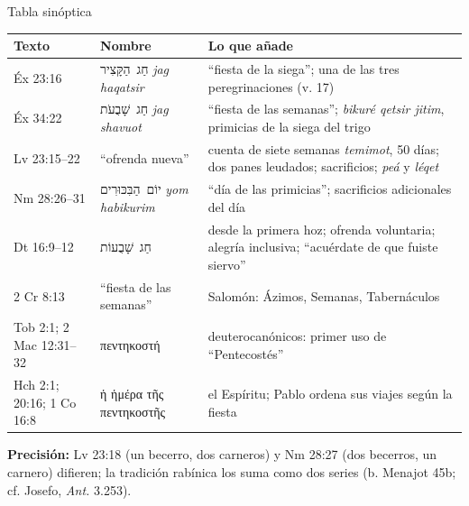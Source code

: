 \documentclass[hyperref={bookmarks=false},aspectratio=169]{beamer}
\newcommand{\heb}[1]{\mbox{\foreignlanguage{hebrew}{#1}}}
\newcommand{\grc}[1]{\foreignlanguage{ancientgreek}{#1}}
\newcommand{\precision}[1]{{\footnotesize\color{sepia}\textbf{Precisión:} #1}}
\begin{document}
\begin{frame}{Tabla sinóptica}
\scriptsize\renewcommand{\arraystretch}{1.12}
\begin{tabular}{@{}L{1.9cm}L{3.0cm}L{6.9cm}@{}}
\toprule
\textbf{Texto} & \textbf{Nombre} & \textbf{Lo que añade} \\ \midrule
Éx 23:16 & \heb{חַג הַקָּצִיר} \emph{jag haqatsir} & ``fiesta de la siega''; una de las tres peregrinaciones (v. 17) \\
Éx 34:22 & \heb{חַג שָׁבֻעֹת} \emph{jag shavuot} & ``fiesta de las semanas''; \emph{bikuré qetsir jitim}, primicias de la siega del trigo \\
Lv 23:15--22 & ``ofrenda nueva'' & cuenta de siete semanas \emph{temimot}, 50 días; dos panes leudados; sacrificios; \emph{peá} y \emph{léqet} \\
Nm 28:26--31 & \heb{יוֹם הַבִּכּוּרִים} \emph{yom habikurim} & ``día de las primicias''; sacrificios adicionales del día \\
Dt 16:9--12 & \heb{חַג שָׁבֻעוֹת} & desde la primera hoz; ofrenda voluntaria; alegría inclusiva; ``acuérdate de que fuiste siervo'' \\
2 Cr 8:13 & ``fiesta de las semanas'' & Salomón: Ázimos, Semanas, Tabernáculos \\
Tob 2:1; 2 Mac 12:31--32 & \grc{πεντηκοστή} & deuterocanónicos: primer uso de ``Pentecostés'' \\
Hch 2:1; 20:16; 1 Co 16:8 & \grc{ἡ ἡμέρα τῆς πεντηκοστῆς} & el Espíritu; Pablo ordena sus viajes según la fiesta \\
\bottomrule
\end{tabular}\par\smallskip
\precision{Lv 23:18 (un becerro, dos carneros) y Nm 28:27 (dos becerros, un carnero) difieren; la tradición rabínica los suma como dos series (b. Menajot 45b; cf. Josefo, \emph{Ant.} 3.253).}
\end{frame}
\end{document}
